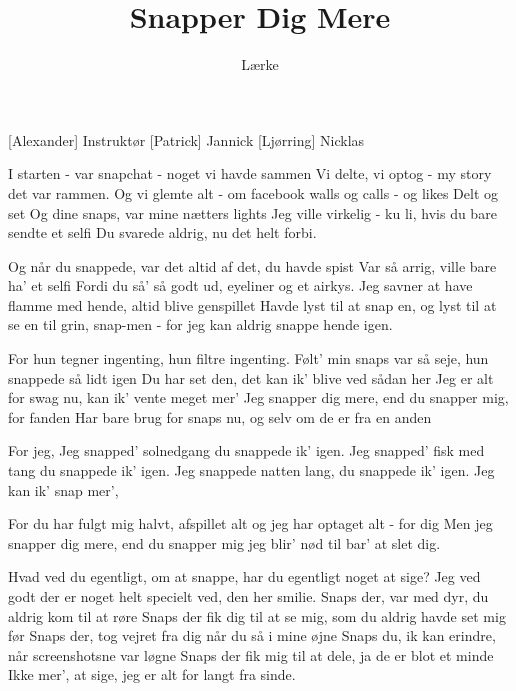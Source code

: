 \documentclass[a4paper,11pt]{article}
\title{Snapper Dig Mere}
\author{Lærke}
\begin{document}
\maketitle

\begin{roles}
[Alexander] Instruktør
[Patrick] Jannick
[Ljørring] Nicklas
\end{roles}

\begin{song}
 I starten - var snapchat - noget vi havde sammen
Vi delte, vi optog - my story det var rammen. 
Og vi glemte alt - om facebook walls og calls - og likes 
Delt og set 
Og dine snaps, var mine nætters lights
Jeg ville virkelig - ku li, hvis du bare sendte et selfi
Du svarede aldrig, nu det helt forbi. 

 Og når du snappede, var det altid af det, du havde spist
Var så arrig, ville bare ha' et selfi
Fordi du så' så godt ud, eyeliner og et airkys. 
Jeg savner at have flamme med hende, altid blive genspillet
Havde lyst til at snap en, og lyst til at se en 
til grin, snap-men - 
 for jeg kan aldrig snappe hende igen. 
 
 For hun tegner ingenting, hun filtre ingenting. 
Følt' min snaps var så seje, hun snappede så lidt igen
Du har set den, det kan ik’ blive ved sådan her
Jeg er alt for swag nu, kan ik’ vente meget mer’
Jeg snapper dig mere, end du snapper mig, for fanden
Har bare brug for snaps nu, og selv om de er fra en anden


 For jeg, 
 Jeg snapped' solnedgang
du snappede ik' igen. 
Jeg snapped' fisk med tang
du snappede ik' igen. 
Jeg snappede natten lang, 
du snappede ik' igen.
Jeg kan ik' snap mer', 

 For du har fulgt mig halvt, afspillet alt 
og jeg har optaget alt - for dig
Men jeg snapper dig mere, end du snapper mig
jeg blir' nød til bar' at slet dig.

 Hvad ved du egentligt, om at snappe, har du egentligt noget at sige?
Jeg ved godt der er noget helt specielt ved, den her smilie.
Snaps der, var med dyr, du aldrig kom til at røre
Snaps der fik dig til at se mig, som du aldrig havde set mig før
Snaps der, tog vejret fra dig når du så i mine øjne
Snaps du, ik kan erindre, når screenshotsne var løgne
Snaps der fik mig til at dele, ja de er blot et minde
Ikke mer’, at sige, jeg er alt for langt fra sinde. 
 

\end{song}
\end{document}
